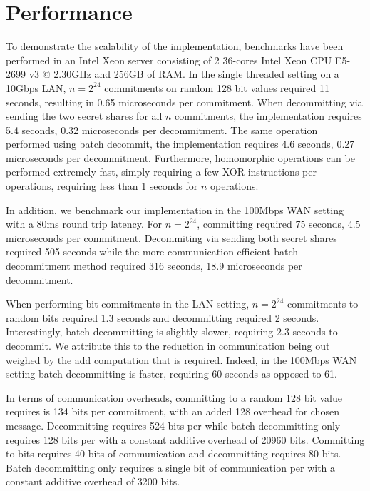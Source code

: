 
\section{Performance}
To demonstrate the scalability of the implementation, benchmarks have been performed in an Intel Xeon server consisting of 2 36-cores Intel Xeon CPU E5-2699 v3 @ 2.30GHz and 256GB of RAM. In the single threaded setting on a 10Gbps LAN, $n=2^{24}$ commitments on random 128 bit values required 11 seconds, resulting in 0.65 microseconds per commitment. When decommitting via sending the two secret shares for all $n$ commitments, the implementation requires 5.4 seconds, 0.32 microseconds per decommitment. The same operation performed using batch decommit, the implementation requires 4.6 seconds, 0.27 microseconds per decommitment. Furthermore, homomorphic operations can be performed extremely fast, simply requiring  a few XOR instructions per operations, requiring less than 1 seconds for $n$ operations. 

In addition, we benchmark our implementation in the 100Mbps WAN setting with a 80ms round trip latency. For $n=2^{24}$, committing  required 75 seconds, 4.5 microseconds per commitment. Decommiting via sending both secret shares required 505 seconds while the more communication efficient batch decommitment method required 316 seconds, 18.9 microseconds per decommitment.



When performing bit commitments in the LAN setting, $n=2^{24}$ commitments to random bits required 1.3 seconds and decommitting required 2 seconds. Interestingly, batch decommitting is slightly slower, requiring 2.3 seconds to decommit. We attribute this to the reduction in communication being out weighed by the add computation that is required. Indeed, in the 100Mbps WAN setting batch decommitting is faster, requiring 60 seconds as opposed to 61.

In terms of communication overheads, committing to a random 128 bit value requires is 134 bits per commitment, with an added 128 overhead for chosen message. Decommitting requires 524 bits per while batch decommitting only requires 128 bits per with a constant additive overhead of 20960 bits. Committing to bits requires 40 bits of communication and decommitting requires 80 bits. Batch decommitting only requires a single bit of communication per with a constant additive overhead of 3200 bits.